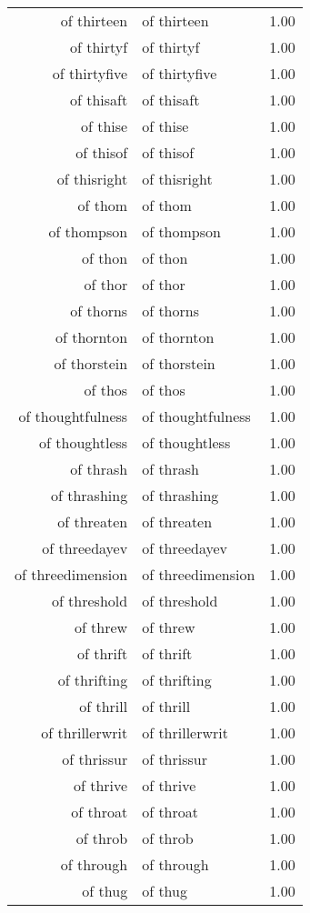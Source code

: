\begin{table}[ht]
\begin{tabular}{rlr}
  of thirteen & of thirteen & 1.00 \\ 
  of thirtyf & of thirtyf & 1.00 \\ 
  of thirtyfive & of thirtyfive & 1.00 \\ 
  of thisaft & of thisaft & 1.00 \\ 
  of thise & of thise & 1.00 \\ 
  of thisof & of thisof & 1.00 \\ 
  of thisright & of thisright & 1.00 \\ 
  of thom & of thom & 1.00 \\ 
  of thompson & of thompson & 1.00 \\ 
  of thon & of thon & 1.00 \\ 
  of thor & of thor & 1.00 \\ 
  of thorns & of thorns & 1.00 \\ 
  of thornton & of thornton & 1.00 \\ 
  of thorstein & of thorstein & 1.00 \\ 
  of thos & of thos & 1.00 \\ 
  of thoughtfulness & of thoughtfulness & 1.00 \\ 
  of thoughtless & of thoughtless & 1.00 \\ 
  of thrash & of thrash & 1.00 \\ 
  of thrashing & of thrashing & 1.00 \\ 
  of threaten & of threaten & 1.00 \\ 
  of threedayev & of threedayev & 1.00 \\ 
  of threedimension & of threedimension & 1.00 \\ 
  of threshold & of threshold & 1.00 \\ 
  of threw & of threw & 1.00 \\ 
  of thrift & of thrift & 1.00 \\ 
  of thrifting & of thrifting & 1.00 \\ 
  of thrill & of thrill & 1.00 \\ 
  of thrillerwrit & of thrillerwrit & 1.00 \\ 
  of thrissur & of thrissur & 1.00 \\ 
  of thrive & of thrive & 1.00 \\ 
  of throat & of throat & 1.00 \\ 
  of throb & of throb & 1.00 \\ 
  of through & of through & 1.00 \\ 
  of thug & of thug & 1.00 \\ 

\end{tabular}
\end{table}
